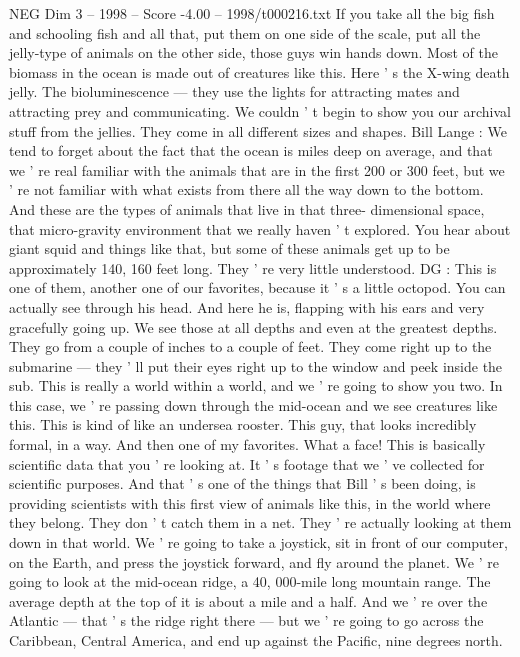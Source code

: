 \begin{textsample}{NEG Dim 3 – 1998 – Score -4.00 – 1998/t000216.txt}
If you take all the big fish and schooling fish and all that, put them on one side of the scale, put all the jelly-type of animals on the other side, those guys win hands down.
Most of the biomass in the ocean is made out of creatures like this.
Here ' s the X-wing death jelly.
The bioluminescence — they use the lights for attracting mates and attracting prey and communicating.
We couldn ' t begin to show you our archival stuff from the jellies.
They come in all different sizes and shapes.
Bill Lange : We tend to forget about the fact that the ocean is miles deep on average, and that we ' re real familiar with the animals that are in the first 200 or 300 feet, but we ' re not familiar with what exists from there all the way down to the bottom.
And these are the types of animals that live in that three- dimensional space, that micro-gravity environment that we really haven ' t explored.
You hear about giant squid and things like that, but some of these animals get up to be approximately 140, 160 feet long.
They ' re very little understood.
DG : This is one of them, another one of our favorites, because it ' s a little octopod.
You can actually see through his head.
And here he is, flapping with his ears and very gracefully going up.
We see those at all depths and even at the greatest depths.
They go from a couple of inches to a couple of feet.
They come right up to the submarine — they ' ll put their eyes right up to the window and peek inside the sub.
This is really a world within a world, and we ' re going to show you two.
In this case, we ' re passing down through the mid-ocean and we see creatures like this.
This is kind of like an undersea rooster.
This guy, that looks incredibly formal, in a way.
And then one of my favorites.
What a face!
This is basically scientific data that you ' re looking at.
It ' s footage that we ' ve collected for scientific purposes.
And that ' s one of the things that Bill ' s been doing, is providing scientists with this first view of animals like this, in the world where they belong.
They don ' t catch them in a net.
They ' re actually looking at them down in that world.
We ' re going to take a joystick, sit in front of our computer, on the Earth, and press the joystick forward, and fly around the planet.
We ' re going to look at the mid-ocean ridge, a 40, 000-mile long mountain range.
The average depth at the top of it is about a mile and a half.
And we ' re over the Atlantic — that ' s the ridge right there — but we ' re going to go across the Caribbean, Central America, and end up against the Pacific, nine degrees north.

\end{textsample}
